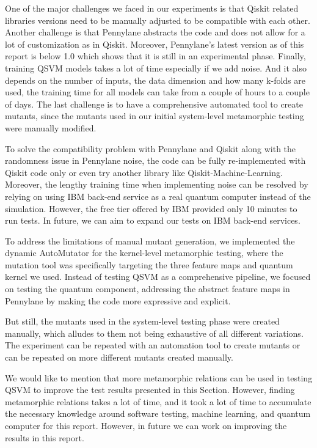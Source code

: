 \documentclass[12pt,a4paper]{article}
\begin{document}
	
	One of the major challenges we faced in our experiments is that Qiskit related libraries versions need to be manually adjusted to be compatible with each other. Another challenge is that Pennylane abstracts the code and does not allow for a lot of customization as in Qiskit. Moreover, Pennylane's latest version as of this report is below 1.0 which shows that it is still in an experimental phase. Finally, training QSVM models takes a lot of time especially if we add noise. And it also depends on the number of inputs, the data dimension and how many k-folds are used, the training time for all models can take from a couple of hours to a couple of days. The last challenge is to have a comprehensive automated tool to create mutants, since the mutants used in our initial system-level metamorphic testing were manually modified.
	
	To solve the compatibility problem with Pennylane and Qiskit along with the randomness issue in Pennylane noise, the code can be fully re-implemented with Qiskit code only or even try another library like Qiskit-Machine-Learning. Moreover, the lengthy training time when implementing noise can be resolved by relying on using IBM back-end service as a real quantum computer instead of the simulation. However, the free tier offered by IBM provided only 10 minutes to run tests. In future, we can aim to expand our tests on IBM back-end services.
	
	To address the limitations of manual mutant generation, we implemented the dynamic AutoMutator for the kernel-level metamorphic testing, where the mutation tool was specifically targeting the three feature maps and quantum kernel we used. Instead of testing QSVM as a comprehensive pipeline, we focused on testing the quantum component, addressing the abstract feature maps in Pennylane by making the code more expressive and explicit.
	
	But still, the mutants used in the system-level testing phase were created manually, which alludes to them not being exhaustive of all different variations. The experiment can be repeated with an automation tool to create mutants or can be repeated on more different mutants created manually.
	
	We would like to mention that more metamorphic relations can be used in testing QSVM to improve the test results presented in this Section. However, finding metamorphic relations takes a lot of time, and it took a lot of time to accumulate the necessary knowledge around software testing, machine learning, and quantum computer for this report. However, in future we can work on improving the results in this report.
	
\end{document}
